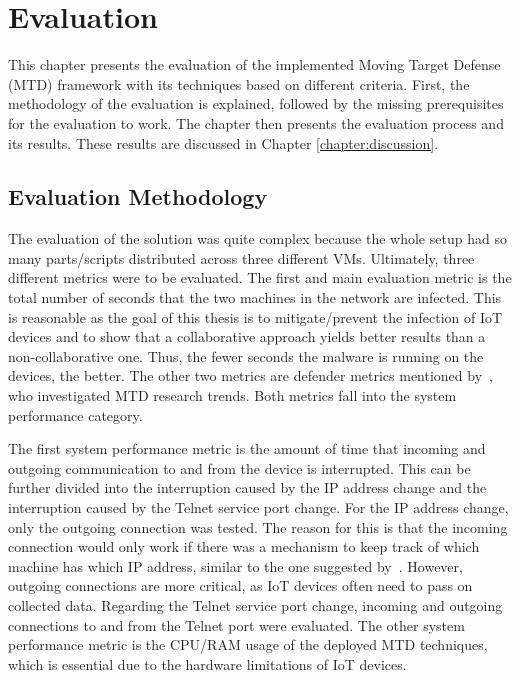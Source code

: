 \chapter{Evaluation}
This chapter presents the evaluation of the implemented Moving Target Defense (MTD) framework with its techniques based on different criteria. First, the methodology of the evaluation is explained, followed by the missing prerequisites for the evaluation to work. The chapter then presents the evaluation process and its results. These results are discussed in Chapter \ref{chapter:discussion}.


\section{Evaluation Methodology} \label{section:evaluationMethodology}
The evaluation of the solution was quite complex because the whole setup had so many parts/scripts distributed across three different VMs. Ultimately, three different metrics were to be evaluated. The first and main evaluation metric is the total number of seconds that the two machines in the network are infected. This is reasonable as the goal of this thesis is to mitigate/prevent the infection of IoT devices and to show that a collaborative approach yields better results than a non-collaborative one. Thus, the fewer seconds the malware is running on the devices, the better. The other two metrics are defender metrics mentioned by~\cite{article:surveyMTD}, who investigated MTD research trends. Both metrics fall into the system performance category. 

The first system performance metric is the amount of time that incoming and outgoing communication to and from the device is interrupted. This can be further divided into the interruption caused by the IP address change and the interruption caused by the Telnet service port change. For the IP address change, only the outgoing connection was tested. The reason for this is that the incoming connection would only work if there was a mechanism to keep track of which machine has which IP address, similar to the one suggested by~\cite{NavasDefenseFramework}. However, outgoing connections are more critical, as IoT devices often need to pass on collected data. Regarding the Telnet service port change, incoming and outgoing connections to and from the Telnet port were evaluated. The other system performance metric is the CPU/RAM usage of the deployed MTD techniques, which is essential due to the hardware limitations of IoT devices.


